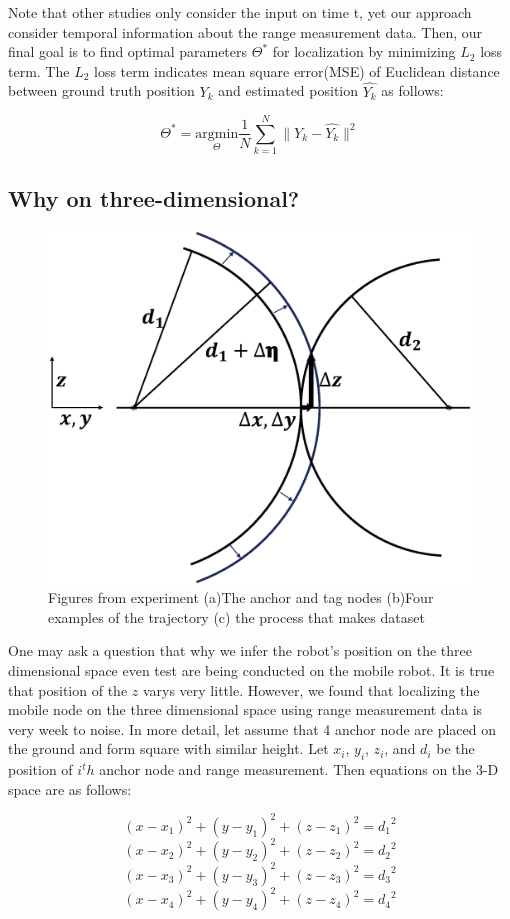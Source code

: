 \documentclass{ieeeaccess}
\begin{document}
Note that other studies only consider the input on time t, yet our approach consider temporal information about the range measurement data. Then, our final goal is to find optimal parameters $\Theta^{*}$ for localization by minimizing $L_2$ loss term. The $L_2$ loss term indicates mean square error(MSE) of Euclidean distance between ground truth position $Y_k$ and estimated position $\hat{Y_k}$ as follows:

\begin{equation}
\Theta^{*} = \underset{\Theta}{\mathrm{argmin}} \frac{1}{N} \sum_{k=1}^N \parallel Y_k - \hat{Y_k} \parallel^{2}
\end{equation}  
 
\subsection{Why on three-dimensional?}

\begin{figure}[h]
	\centering
	\includegraphics[width=.4\textwidth]{image/3D_error_increasing_revised}
	\caption{Figures from experiment (a)The anchor and tag nodes (b)Four examples of the trajectory (c) the process that makes dataset}
	\label{fig:range_error_reason}
\end{figure}

One may ask a question that why we infer the robot's position on the three dimensional space even test are being conducted on the mobile robot. It is true that position of the $z$ varys very little. However, we found that localizing the mobile node on the three dimensional space using range measurement data is very week to noise. In more detail, let assume that 4 anchor node are placed on the ground and form square with similar height. Let $x_i$, $y_i$, $z_i$, and $d_i$ be the position of $i^th$ anchor node and range measurement. Then equations on the 3-D space are as follows:      


\begin{equation}
(x-x_1)^2+(y-y_1)^2+(z-z_1)^2={d_1}^2 \label{eq:range1}
\end{equation}
\begin{equation}
(x-x_2)^2+(y-y_2)^2+(z-z_2)^2={d_2}^2 \label{eq:range2}
\end{equation}
\begin{equation}
(x-x_3)^2+(y-y_3)^2+(z-z_3)^2={d_3}^2 \label{eq:range3}
\end{equation}
\begin{equation}
(x-x_4)^2+(y-y_4)^2+(z-z_4)^2={d_4}^2 \label{eq:range4}
\end{equation}
\end{document}
